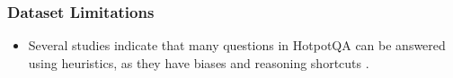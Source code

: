 \documentclass[10pt]{beamer}
\begin{document}
\begin{frame}
  \frametitle{Dataset Limitations}
  \begin{itemize}
    \item Several studies \cite{RN154} \cite{RN176} \cite{RN150} \cite{RN175} indicate that many questions in HotpotQA can be answered using heuristics, 
    as they have biases and reasoning shortcuts \cite{RN177}.
  \end{itemize}
  
\end{frame}





\end{document}
